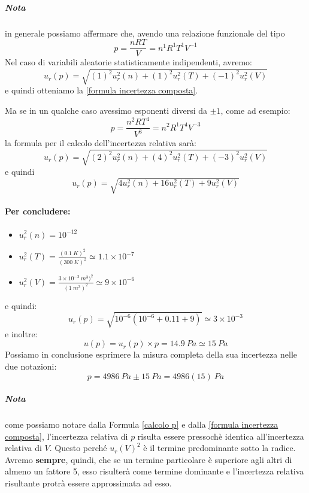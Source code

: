 \documentclass[a4paper,11pt]{report}
\begin{document}
\subparagraph*{Nota} in generale possiamo affermare che, avendo una relazione funzionale del tipo
$$
  p = \frac{nRT}{V} = n^1 R^1 T^1 V^{-1}
$$
Nel caso di variabili aleatorie statisticamente indipendenti, avremo:
$$
  u_r(p) = \sqrt{(1)^2u_r^2(n)+(1)^2u_r^2(T)+(-1)^2u_r^2(V)}
$$ e quindi otteniamo la \ref{formula incertezza composta}.

Ma se in un qualche caso avessimo esponenti diversi da $\pm 1$, come ad esempio:
$$
  p = \frac{n^2 R T^4}{V^3} = n^2 R^1 T^4 V^{-3}  
$$
la formula per il calcolo dell'incertezza relativa sarà:
$$
  u_r(p) = \sqrt{(2)^2u_r^2(n)+(4)^2u_r^2(T)+(-3)^2u_r^2(V)}
$$ e quindi
$$
  u_r(p) = \sqrt{4u_r^2(n)+16u_r^2(T)+9u_r^2(V)}  
$$
\paragraph{Per concludere:}
\begin{itemize}
  \item $u_r^2(n) = 10^{-12}$
  \item $u_r^2(T) = \frac{(0.1~K)^2}{(300~K)^2} \simeq 1.1\times 10^{-7}$
  \item $u_r^2(V) = \frac{3\times 10^{-3}~ m^3)^2}{(1~m^3)^2} \simeq 9\times 10^{-6}$
\end{itemize}
e quindi:
\begin{equation}
  \label{calcolo p}
  u_r(p) = \sqrt{10^{-6}(10^{-6}+0.11+9)} \simeq 3\times 10^{-3}
\end{equation}
e inoltre:
$$
  u(p) = u_r(p)\times p = 14.9~ Pa \simeq 15~Pa
$$
Possiamo in conclusione esprimere la misura completa della sua incertezza nelle due notazioni:
$$
  p = 4986~ Pa\pm 15~ Pa = 4986(15)~ Pa
$$
\subparagraph{Nota} come possiamo notare dalla Formula \ref{calcolo p} e dalla \ref{formula incertezza composta}, l'incertezza relativa di $p$ risulta essere pressochè identica all'incertezza relativa di $V$. Questo perché $u_r(V)^2$ è il termine predominante sotto la radice. Avremo \textbf{sempre}, quindi, che se un termine particolare è superiore agli altri di almeno un fattore 5, esso risulterà come termine dominante e l'incertezza relativa risultante protrà essere approssimata ad esso.
\end{document}
